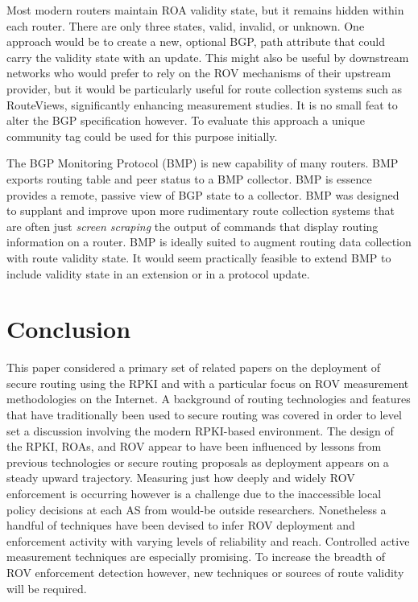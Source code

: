 \documentclass[sigconf]{acmart}
\begin{document}
Most modern routers maintain ROA validity state, but it remains hidden
within each router.  There are only three states, valid, invalid, or
unknown.  One approach would be to create a new, optional BGP, path
attribute that could carry the validity state with an update.  This
might also be useful by downstream networks who would prefer to rely on
the ROV mechanisms of their upstream provider, but it would be
particularly useful for route collection systems such as RouteViews,
significantly enhancing measurement studies.  It is no small feat to
alter the BGP specification however.  To evaluate this approach
a unique community tag could be used for this purpose initially.

The BGP Monitoring Protocol (BMP) is new capability of many
routers.\cite{scudder_bgp_2016} BMP exports routing table and peer
status to a BMP collector.  BMP is essence provides a remote, passive
view of BGP state to a collector.  BMP was designed to supplant and
improve upon more rudimentary route collection systems that are often
just \emph{screen scraping} the output of commands that display routing
information on a router.  BMP is ideally suited to augment routing data
collection with route validity state.  It would seem practically
feasible to extend BMP to include validity state in an extension or in a
protocol update.

\section{Conclusion}\label{sec:Conclusion}

This paper considered a primary set of related papers on the deployment
of secure routing using the RPKI and with a particular focus on ROV
measurement methodologies on the Internet.  A background of routing
technologies and features that have traditionally been used to secure
routing was covered in order to level set a discussion involving the
modern RPKI-based environment.  The design of the RPKI, ROAs, and ROV
appear to have been influenced by lessons from previous technologies or
secure routing proposals as deployment appears on a steady upward
trajectory.  Measuring just how deeply and widely ROV enforcement is
occurring however is a challenge due to the inaccessible local policy
decisions at each AS from would-be outside researchers.  Nonetheless a
handful of techniques have been devised to infer ROV deployment and
enforcement activity with varying levels of reliability and reach.
Controlled active measurement techniques are especially promising.  To
increase the breadth of ROV enforcement detection however, new
techniques or sources of route validity will be required.
\end{document}
